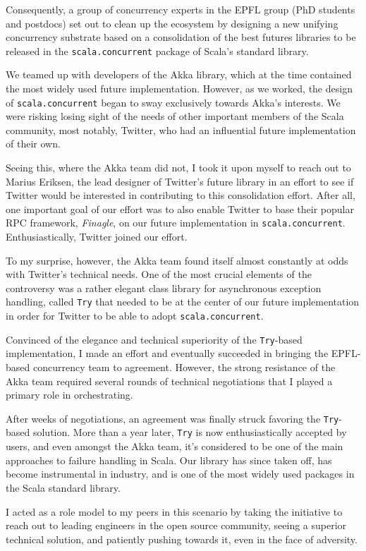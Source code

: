 \documentclass[acmtocl]{acmtrans2m}
\begin{document}
Consequently, a group of concurrency experts in the EPFL group (PhD students
and postdocs) set out to clean up the ecosystem by designing a new unifying
concurrency substrate based on a consolidation of the best futures libraries
to be released in the \verb|scala.concurrent| package of Scala's standard
library.

We teamed up with developers of the Akka library, which at the time
contained the most widely used future implementation. However, as we worked,
the design of \verb|scala.concurrent| began to sway exclusively towards Akka's
interests. We were risking losing sight of the needs of other important
members of the Scala community, most notably, Twitter, who had an influential
future implementation of their own.

Seeing this, where the Akka team did not, I took it upon myself to reach out
to Marius Eriksen, the lead designer of Twitter's future library in an effort
to see if Twitter would be interested in contributing to this consolidation
effort. After all, one important goal of our effort was to also enable Twitter
to base their popular RPC framework, \textit{Finagle}, on our future
implementation in \verb|scala.concurrent|. Enthusiastically, Twitter joined
our effort.

To my surprise, however, the Akka team found itself almost constantly at odds
with Twitter's technical needs. One of the most crucial elements of the
controversy was a rather elegant class library for asynchronous exception
handling, called \verb|Try| that needed to be at the center of our future
implementation in order for Twitter to be able to adopt
\verb|scala.concurrent|.

Convinced of the elegance and technical superiority of the \verb|Try|-based
implementation, I made an effort and eventually succeeded in bringing the
EPFL-based concurrency team to agreement. However, the strong resistance of
the Akka team required several rounds of technical negotiations that I played
a primary role in orchestrating.

After weeks of negotiations, an agreement was finally struck favoring the
\verb|Try|-based solution. More than a year later, \verb|Try| is now
enthusiastically accepted by users, and even amongst the Akka team, it's
considered to be one of the main approaches to failure handling in Scala. Our
library has since taken off, has become instrumental in industry, and is one
of the most widely used packages in the Scala standard library.

I acted as a role model to my peers in this scenario by taking the initiative
to reach out to leading engineers in the open source community, seeing a
superior technical solution, and patiently pushing towards it, even in the
face of adversity.
\end{document}

